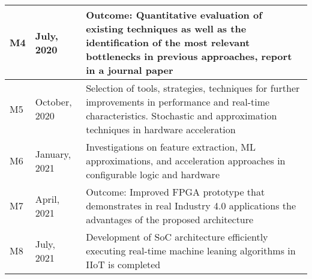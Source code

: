 \begin{table}[p]
\begin{tabular}{|l|l|m{8.5cm}|}
		M4                 & July, 2020      & Outcome: Quantitative evaluation of existing techniques as well as the identification of the most relevant bottlenecks in previous approaches, report in a journal paper                                                                                                                                                                                                                                                                                                            \\ \hline
		M5                 & October, 2020   & Selection of tools, strategies, techniques for further improvements in performance and real-time characteristics. Stochastic and approximation techniques in hardware acceleration                                                                                                                                                                                                                                                                                                  \\ \hline
		M6                 & January, 2021   & Investigations on feature extraction, ML approximations, and acceleration approaches in configurable logic and hardware                                                                                                                                                                                                                                                                                                                                                             \\ \hline
		M7                 & April, 2021     & Outcome: Improved FPGA prototype that demonstrates in real Industry 4.0 applications the advantages of the proposed architecture                                                                                                                                                                                                                                                                                                                                                    \\ \hline
		M8                 & July, 2021      & Development of SoC architecture efficiently executing real-time machine leaning algorithms in IIoT is completed                                                                                                                                                                                                                                                                                                                                                                     \\ \hline

\end{tabular}
\end{table}
